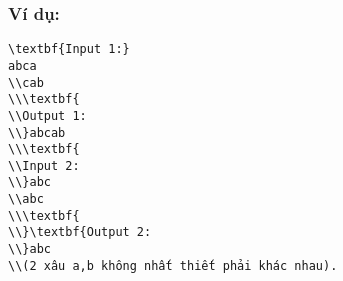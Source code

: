 \subsubsection{\textbf{    Ví dụ:   }}
\begin{verbatim}
\textbf{Input 1:}
abca
\\cab
\\\textbf{
\\Output 1:
\\}abcab
\\\textbf{
\\Input 2:
\\}abc
\\abc
\\\textbf{
\\}\textbf{Output 2:
\\}abc
\\(2 xâu a,b không nhất thiết phải khác nhau).\end{verbatim}
